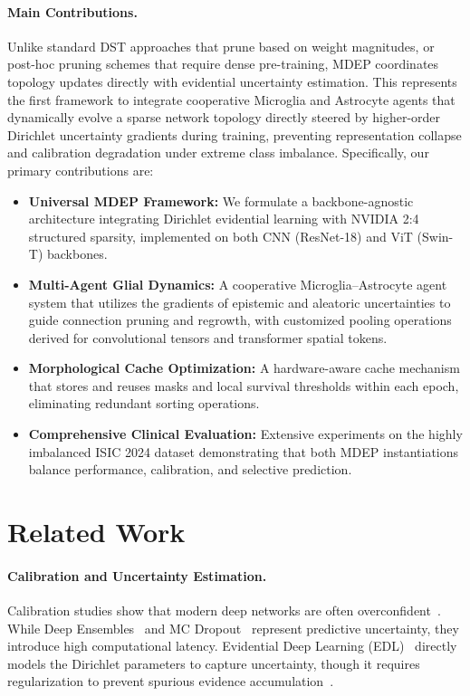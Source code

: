 \documentclass[letterpaper]{article} %
\begin{document}
\paragraph{Main Contributions.} Unlike standard DST approaches that prune based on weight magnitudes, or post-hoc pruning schemes that require dense pre-training, MDEP coordinates topology updates directly with evidential uncertainty estimation. This represents the first framework to integrate cooperative Microglia and Astrocyte agents that dynamically evolve a sparse network topology directly steered by higher-order Dirichlet uncertainty gradients during training, preventing representation collapse and calibration degradation under extreme class imbalance. Specifically, our primary contributions are:
\begin{itemize}
    \item \textbf{Universal MDEP Framework:} We formulate a backbone-agnostic architecture integrating Dirichlet evidential learning with NVIDIA 2:4 structured sparsity, implemented on both CNN (ResNet-18) and ViT (Swin-T) backbones.
    \item \textbf{Multi-Agent Glial Dynamics:} A cooperative Microglia--Astrocyte agent system that utilizes the gradients of epistemic and aleatoric uncertainties to guide connection pruning and regrowth, with customized pooling operations derived for convolutional tensors and transformer spatial tokens.
    \item \textbf{Morphological Cache Optimization:} A hardware-aware cache mechanism that stores and reuses masks and local survival thresholds within each epoch, eliminating redundant sorting operations.
    \item \textbf{Comprehensive Clinical Evaluation:} Extensive experiments on the highly imbalanced ISIC 2024 dataset demonstrating that both MDEP instantiations balance performance, calibration, and selective prediction.
\end{itemize}

\section{Related Work}\label{sec:related}

\paragraph{Calibration and Uncertainty Estimation.} Calibration studies show that modern deep networks are often overconfident~\cite{guo2017calibration, minderer2021revisiting}. While Deep Ensembles~\cite{lakshminarayanan2017simple} and MC Dropout~\cite{gal2016dropout} represent predictive uncertainty, they introduce high computational latency. Evidential Deep Learning (EDL)~\cite{sensoy2018evidential} directly models the Dirichlet parameters to capture uncertainty, though it requires regularization to prevent spurious evidence accumulation~\cite{shen2024mirage}.
\end{document}
